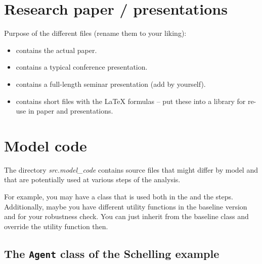 \documentclass[a4paper,11pt,english]{sphinxmanual}
\begin{document}
\chapter{Research paper / presentations}
\label{paper:paper}\label{paper::doc}\label{paper:research-paper-presentations}
Purpose of the different files (rename them to your liking):
\begin{itemize}
\item {} 
 contains the actual paper.

\item {} 
 contains a typical conference presentation.

\item {} 
 contains a full-length seminar presentation (add by yourself).

\item {} 
 contains short files with the LaTeX formulas -- put these into a library for re-use in paper and presentations.

\end{itemize}


\chapter{Model code}
\label{model_code:id1}\label{model_code::doc}\label{model_code:model-code}
The directory \emph{src.model\_code} contains source files that might differ by model and that are potentially used at various steps of the analysis.

For example, you may have a class that is used both in the {\hyperref[analysis:analysis]{}} and the {\hyperref[final:final]{}} steps. Additionally, maybe you have different utility functions in the baseline version and for your robustness check. You can just inherit from the baseline class and override the utility function then.


\section{The \texttt{Agent} class of the Schelling example}
\label{model_code:module-src.model_code.agent}\label{model_code:the-agent-class-of-the-schelling-example}
\end{document}
